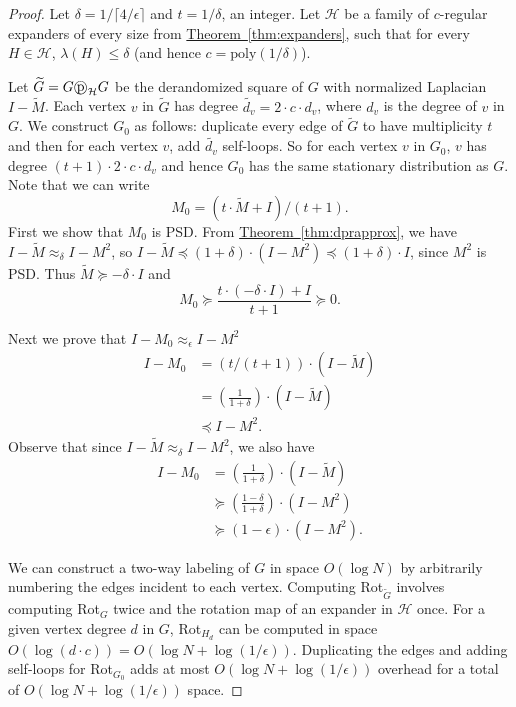 \documentclass[11pt]{article}
\numberwithin{equation}{section}
\theoremstyle{definition}
\theoremstyle{plain}
\newcommand{\expref}[2]{\hyperref[#2]{#1~\ref{#2}}}
\newcommand{\wt}{\widetilde}   %
\newcommand{\dpr}{\text{\textcircled{p}}_{\mathcal{H}}}
\numberwithin{myalgctr}{section}
\theoremstyle{named}
\begin{document}
\begin{proof}
Let $\delta=1/\lceil{4/\epsilon}\rceil$ and $t=1/\delta$, an integer. Let $\mathcal{H}$ be a family of $c$-regular expanders of every size from \expref{Theorem}{thm:expanders}, such that for every $H\in\mathcal{H}$, $\lambda(H)\leq \delta$ (and hence $c=\mathrm{poly}(1/\delta)$). 

Let $\wt{G}=G\dpr G$ be the derandomized square of $G$ with normalized Laplacian $I-\wt{M}$. Each vertex $v$ in $\wt{G}$ has degree $\wt{d_v}=2\cdot c\cdot d_v$, where $d_v$ is the degree of $v$ in $G$. We construct $G_0$ as follows: duplicate every edge of $\wt{G}$ to have multiplicity $t$ and then for each vertex $v$, add $\wt{d_v}$ self-loops. So for each vertex $v$ in $G_0$, $v$ has degree $(t+1)\cdot 2\cdot c\cdot d_v$ and hence $G_0$ has the same stationary distribution as $G$. Note that we can write 
\[
M_0 = (t\cdot \wt{M} + I)/(t+1).
\]
First we show that $M_0$ is PSD. {}From \expref{Theorem}{thm:dprapprox}, we have $I-\wt{M}\approx_{\delta}I-M^2$, so $I-\wt{M}\preceq (1+\delta)\cdot (I-M^2)\preceq (1+\delta)\cdot I$, since $M^2$ is PSD. Thus $\wt{M}\succeq -\delta\cdot I$ and
\[
M_0\succeq\frac{t\cdot(-\delta \cdot I)+I}{t+1}\succeq 0.
\]

Next we prove that $I-M_0\approx_{\epsilon}I-M^2$ 
\begin{align*}
I-M_0&=(t/(t+1))\cdot(I-\wt{M})\\
&=\left(\frac{1}{1+\delta}\right)\cdot(I-\wt{M})\\
&\preceq I-M^2.
\end{align*}
Observe that since $I-\wt{M}\approx_{\delta} I-M^2$, we also have
\begin{align*}
I-M_0&=\left(\frac{1}{1+\delta}\right)\cdot(I-\wt{M})\\
&\succeq \left(\frac{1-\delta}{1+\delta}\right)\cdot(I-M^2)\\
&\succeq (1-\epsilon)\cdot(I-M^2).
\end{align*}

We can construct a two-way labeling of $G$ in space $O(\log N)$ by arbitrarily numbering the edges incident to each vertex. Computing Rot$_{\wt{G}}$ involves computing Rot$_G$ twice and the rotation map of an expander in $\mathcal{H}$ once. For a given vertex degree $d$ in $G$, Rot$_{H_{d}}$ can be computed in space $O(\log (d\cdot c))=O(\log N + \log(1/\epsilon))$. Duplicating the edges and adding self-loops for Rot$_{G_0}$ adds at most $O(\log N+\log(1/\epsilon))$ overhead for a total of $O(\log N+\log(1/\epsilon))$ space.
\end{proof}
\end{document}
